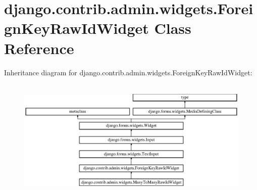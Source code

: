 \hypertarget{classdjango_1_1contrib_1_1admin_1_1widgets_1_1_foreign_key_raw_id_widget}{}\section{django.\+contrib.\+admin.\+widgets.\+Foreign\+Key\+Raw\+Id\+Widget Class Reference}
\label{classdjango_1_1contrib_1_1admin_1_1widgets_1_1_foreign_key_raw_id_widget}
Inheritance diagram for django.\+contrib.\+admin.\+widgets.\+Foreign\+Key\+Raw\+Id\+Widget\+:\begin{figure}[H]
\begin{center}
\leavevmode
\includegraphics[height=5.798817cm]{classdjango_1_1contrib_1_1admin_1_1widgets_1_1_foreign_key_raw_id_widget}
\end{center}
\end{figure}
